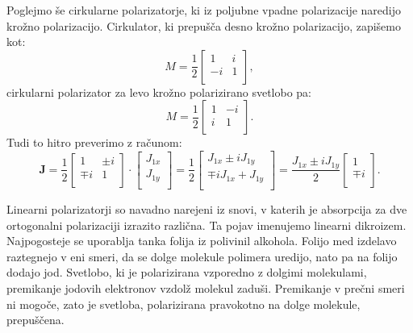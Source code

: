 Poglejmo še cirkularne polarizatorje, ki iz poljubne
vpadne polarizacije naredijo krožno polarizacijo. Cirkulator, ki
prepušča desno krožno polarizacijo, zapišemo kot:
\begin{equation}
M = \frac{1}{2}\left[\begin{array}{cc}
1 & i \\
-i & 1\\
\end{array}\right]\!\!, 
\label{eq:03_52}
\end{equation}
cirkularni polarizator za levo krožno polarizirano svetlobo pa:
\begin{equation}
M = \frac{1}{2}\left[\begin{array}{cc}
1 & -i \\
i & 1\\
\end{array}\right]\!\!.
\label{eq:03_53}
\end{equation}
Tudi to hitro preverimo z računom:
\begin{equation}
\mathbf{J} = \frac{1}{2}\left[\begin{array}{cc}
1 & \pm i \\
\mp i & 1\\
\end{array}\right]\cdot 
\left[\begin{array}{c}
J_{1x}\\
J_{1y}\\
\end{array}\right]\!\! = 
\frac{1}{2}\left[\begin{array}{c}
J_{1x} \pm i J_{1y}\\
\mp i J_{1x} + J_{1y}\\
\end{array}\right]\!\!=
\frac{J_{1x}\pm i J_{1y}}{2}\left[\begin{array}{c}
1\\
\mp i\\
\end{array}\right]\!\!.
\label{eq:03_54}
\end{equation}

\begin{remark}
Linearni polarizatorji so navadno narejeni iz snovi, v
katerih je absorpcija za dve ortogonalni polarizaciji izrazito različna.
Ta pojav imenujemo linearni dikroizem. Najpogosteje se uporablja
tanka folija iz polivinil alkohola. Folijo med izdelavo raztegnejo v
eni smeri, da se dolge molekule polimera uredijo, nato pa na folijo
dodajo jod. Svetlobo, ki je polarizirana vzporedno z dolgimi molekulami,
premikanje jodovih elektronov vzdolž molekul zaduši. Premikanje v prečni
smeri ni mogoče, zato je svetloba, polarizirana pravokotno na dolge
molekule, prepuščena. 
\end{remark}

